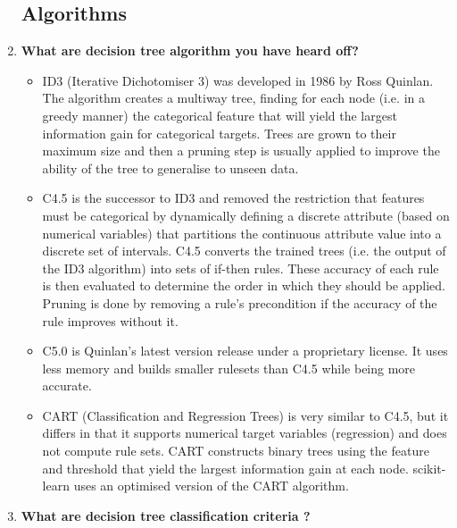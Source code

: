 \begin{enumerate}
\subsection{Algorithms}

\item{\textbf{\color{blue} What are decision tree algorithm you have heard off?}}
\begin{itemize}

\item ID3 (Iterative Dichotomiser 3) was developed in 1986 by Ross Quinlan. The algorithm creates a multiway tree, finding for each node (i.e. in a greedy manner) the categorical feature that will yield the largest information gain for categorical targets. Trees are grown to their maximum size and then a pruning step is usually applied to improve the ability of the tree to generalise to unseen data.


\item C4.5 is the successor to ID3 and removed the restriction that features must be categorical by dynamically defining a discrete attribute (based on numerical variables) that partitions the continuous attribute value into a discrete set of intervals. C4.5 converts the trained trees (i.e. the output of the ID3 algorithm) into sets of if-then rules. These accuracy of each rule is then evaluated to determine the order in which they should be applied. Pruning is done by removing a rule’s precondition if the accuracy of the rule improves without it.


\item C5.0 is Quinlan’s latest version release under a proprietary license. It uses less memory and builds smaller rulesets than C4.5 while being more accurate.


\item CART (Classification and Regression Trees) is very similar to C4.5, but it differs in that it supports numerical target variables (regression) and does not compute rule sets. CART constructs binary trees using the feature and threshold that yield the largest information gain at each node.
scikit-learn uses an optimised version of the CART algorithm.

\end{itemize}




\item{\textbf{\color{blue}  What are decision tree classification criteria ?}}  


\end{enumerate}
